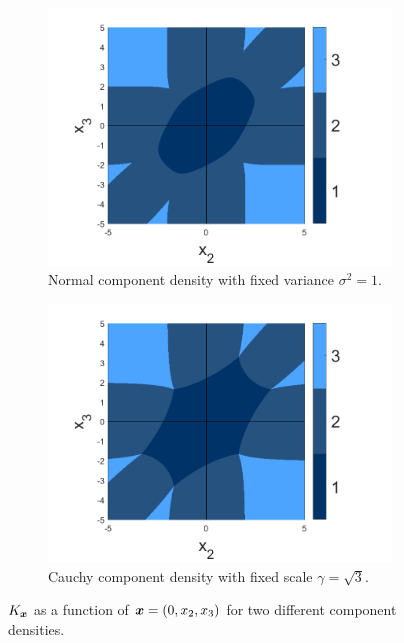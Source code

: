 
	\begin{figure}[ht]
	\centering
		\begin{subfigure}[t]{0.49\textwidth}
			\centering
			\includegraphics[width=\textwidth]{normal_flag_graph.png}
			\caption{Normal component density with fixed variance $\sigma^2 = 1$.}
			\label{fig:normal_flag_graph}
		\end{subfigure}
		\begin{subfigure}[t]{0.49\textwidth}
			\centering
			\includegraphics[width=\textwidth]{cauchy_flag_graph.png}
			\caption{Cauchy component density with fixed scale $\gamma = \sqrt{3}$.}
			\label{fig:cauchy_flag_graph}
		\end{subfigure}
		\caption{$K_{\bm{{x}}}$ as a function of ${\bm{{x}}} = (0, x_2, x_3)$ for two different component densities.}
	\end{figure}
	
